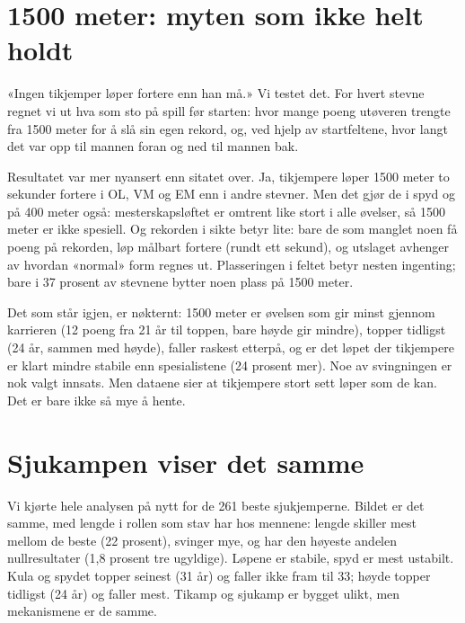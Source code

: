\section{1500 meter: myten som ikke helt holdt}\label{meter-myten-som-ikke-helt-holdt}

«Ingen tikjemper løper fortere enn han må.» Vi testet det. For hvert stevne regnet vi ut hva som sto på spill før starten: hvor mange poeng utøveren trengte fra 1500 meter for å slå sin egen rekord, og, ved hjelp av startfeltene, hvor langt det var opp til mannen foran og ned til mannen bak.

Resultatet var mer nyansert enn sitatet over. Ja, tikjempere løper 1500 meter to sekunder fortere i OL, VM og EM enn i andre stevner. Men det gjør de i spyd og på 400 meter også: mesterskapsløftet er omtrent like stort i alle øvelser, så 1500 meter er ikke spesiell. Og rekorden i sikte betyr lite: bare de som manglet noen få poeng på rekorden, løp målbart fortere (rundt ett sekund), og utslaget avhenger av hvordan «normal» form regnes ut. Plasseringen i feltet betyr nesten ingenting; bare i 37 prosent av stevnene bytter noen plass på 1500 meter.

Det som står igjen, er nøkternt: 1500 meter er øvelsen som gir minst gjennom karrieren (12 poeng fra 21 år til toppen, bare høyde gir mindre), topper tidligst (24 år, sammen med høyde), faller raskest etterpå, og er det løpet der tikjempere er klart mindre stabile enn spesialistene (24 prosent mer). Noe av svingningen er nok valgt innsats. Men dataene sier at tikjempere stort sett løper som de kan. Det er bare ikke så mye å hente.

\section{Sjukampen viser det samme}\label{sjukampen-viser-det-samme}

Vi kjørte hele analysen på nytt for de 261 beste sjukjemperne. Bildet er det samme, med lengde i rollen som stav har hos mennene: lengde skiller mest mellom de beste (22 prosent), svinger mye, og har den høyeste andelen nullresultater (1,8 prosent tre ugyldige). Løpene er stabile, spyd er mest ustabilt. Kula og spydet topper seinest (31 år) og faller ikke fram til 33; høyde topper tidligst (24 år) og faller mest. Tikamp og sjukamp er bygget ulikt, men mekanismene er de samme.

